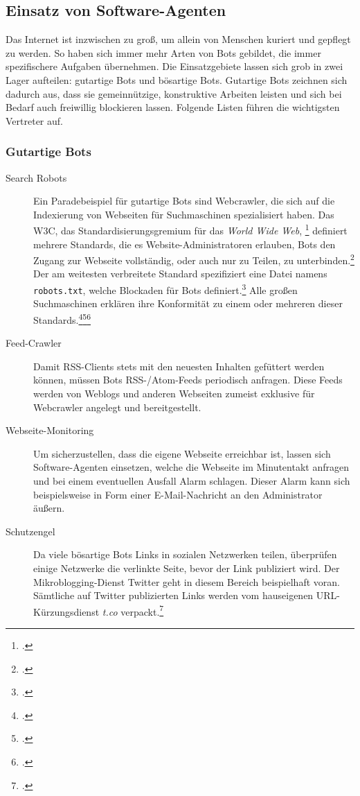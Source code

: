 \subsection{Einsatz von Software-Agenten}
\label{sub:einsatz-von-software-agenten}

Das Internet ist inzwischen zu groß, um allein von Menschen kuriert und
gepflegt zu werden. So haben sich immer mehr Arten von Bots gebildet, die immer
spezifischere Aufgaben übernehmen. Die Einsatzgebiete lassen sich grob in zwei
Lager aufteilen: gutartige Bots und bösartige Bots. Gutartige Bots zeichnen
sich dadurch aus, dass sie gemeinnützige, konstruktive Arbeiten leisten und
sich bei Bedarf auch freiwillig blockieren lassen. Folgende Listen führen die
wichtigsten Vertreter auf.

\subsubsection{Gutartige Bots}
\label{ssub:gutartige-bots}

\begin{description}
  \item[Search Robots]
  Ein Paradebeispiel für gutartige Bots sind Webcrawler, die sich auf die
  Indexierung von Webseiten für Suchmaschinen spezialisiert haben. Das W3C, das
  Standardisierungsgremium für das \emph{World Wide Web},
  \footcite{w3c:standards} definiert mehrere Standards, die es
  Website-Administratoren erlauben, Bots den Zugang zur Webseite vollständig,
  oder auch nur zu Teilen, zu unterbinden.\footcite{w3c:searchBots}
  \label{robotstxt} Der am weitesten verbreitete Standard spezifiziert eine
  Datei namens \texttt{robots.txt}, welche Blockaden für Bots
  definiert.\footcite{w3c:robotsTxt} Alle großen Suchmaschinen erklären ihre
  Konformität zu einem oder mehreren dieser
  Standards.\footcite{robotsTagGoogle}\footcite{yandexUsingRobotsTxt}\footcite{duckduckgoBot}
  
  \item[Feed-Crawler]
  Damit RSS-Clients stets mit den neuesten Inhalten gefüttert werden können,
  müssen Bots RSS-/Atom-Feeds periodisch anfragen. Diese Feeds werden von
  Weblogs und anderen Webseiten zumeist exklusive für Webcrawler angelegt und
  bereitgestellt.
  
  \item[Webseite-Monitoring]
  Um sicherzustellen, dass die eigene Webseite erreichbar ist, lassen sich
  Software-Agenten einsetzen, welche die Webseite im Minutentakt anfragen und
  bei einem eventuellen Ausfall Alarm schlagen. Dieser Alarm kann sich
  beispielsweise in Form einer E-Mail-Nachricht an den Administrator äußern.
  
  \item[Schutzengel]
  Da viele bösartige Bots Links in sozialen Netzwerken teilen, überprüfen
  einige Netzwerke die verlinkte Seite, bevor der Link publiziert wird. Der
  Mikroblogging-Dienst Twitter geht in diesem Bereich beispielhaft voran.
  Sämtliche auf Twitter publizierten Links werden vom hauseigenen
  URL-Kürzungsdienst \emph{t.co} verpackt.\footcite{twitterShortLink}
\end{description}

